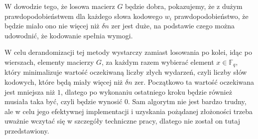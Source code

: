 \documentclass[a4paper,12pt]{article}
\theoremstyle{definition}
\begin{document}
W dowodzie tego, że losowa macierz $G$ będzie dobra, pokazujemy, że z dużym prawdopodobieństwem dla każdego słowa kodowego $w_i$ prawdopodobieństwo, że będzie miało ono nie więcej niż $\delta n$ zer jest duże, na podstawie czego można udowodnić, że kodowanie spełnia wymogi.

W celu derandomizacji tej metody wystarczy zamiast losowania po kolei, idąc po wierszach, elementy macierzy $G$, za każdym razem wybierać element $x \in \mathbb F_q$, który minimalizuje wartość oczekiwaną liczby złych wydarzeń, czyli liczby słów kodowych, które będą miały więcej niż $\delta n$ zer. Początkowo ta wartość oczekiwana jest mniejsza niż $1$, dlatego po wykonaniu ostatniego kroku będzie również musiała taka być, czyli będzie wynosić $0$.
Sam algorytm nie jest bardzo trudny, ale w celu jego efektywnej implementacji i uzyskania pożądanej złożoności 
trzeba uważnie wczytać się w szczegóły techniczne pracy\cite{group_testing_schemes}, dlatego nie został on tutaj przedstawiony.

\begin{thebibliography}{}


\end{thebibliography}
\end{document}
